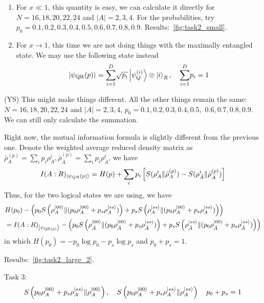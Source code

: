\documentclass{article}
\theoremstyle{plain}
\theoremstyle{definition}
\theoremstyle{plain}
\newcommand{\YS}[1]{{\color{YSblue}\footnotesize{(YS) #1}}}
\begin{document}
\begin{enumerate}
    \item For $x\ll 1$, this quantity is easy, we can calculate it directly for $N=16,18,20,22,24$ and $|A|=2,3,4$. For the probabilities, try $p_0=0.1, 0.2, 0.3, 0.4, 0.5, 0.6, 0.7, 0.8, 0.9$. Results:~\cref{fig:task2_small}.
    \item For $x \rightarrow 1$, this time we are not doing things with the maximally entangled state. We may use the following state instead
    \begin{equation}
        \ket{\psi_{\text{QR}}(p)}=\overunderset{D}{i=1}{\sum}\sqrt{p_i}\ket{\psi_Q^{(i)}}\otimes \ket{i}_R,\quad \overunderset{D}{i=1}{\sum}p_i=1
    \end{equation}
\end{enumerate}
\YS{This might make things different.} All the other things remain the same: $N=16,18,20,22,24$ and $|A|=2,3,4$, $p_0=0.1, 0.2, 0.3, 0.4, 0.5,$ $0.6 ,0.7, 0.8, 0.9$. We can still only calculate the summation.

Right now, the mutual information formula is slightly different from the previous one. Denote the weighted average reduced density matrix as $\bar{\rho}_A^{(p)}=\sum_i p_i \rho_A^i, \bar{\rho}_{\bar{A}}^{(p)}=\sum_i p_i \rho_{\bar{A}}^i$, we have
\begin{equation}
    I(A:R)_{\ket{\psi_{QR}(p)}}=H(p)+\sum_i p_i\left[ S(\rho_A^i\| \bar{\rho}_A^{(p)})-S(\rho_{\bar{A}}^i\| \bar{\rho}_{\bar{A}}^{(p)})\right]
\end{equation}
Thus, for the two logical states we are using, we have
\begin{equation}
    \begin{aligned}
    &H(p_0) -\left(p_0S\left(\rho_{A}^{\ket{00}} \|(p_0\rho_{A}^{\ket{00}}+p_s \rho_{A}^{\ket{ss}})\right)+p_sS\left(\rho_{A}^{\ket{ss}} \|(p_0\rho_{A}^{\ket{00}}+ p_s\rho_{A}^{\ket{ss}})\right)\right)\\
    &=I(A:R)_{\ket{\psi_{\text{QR}(p)}}}-\left(p_0S\left(\rho_{\bar A}^{\ket{00}} \|(p_0\rho_{\bar A}^{\ket{00}}+p_s \rho_{\bar A}^{\ket{ss}})\right)+p_sS\left(\rho_{\bar A}^{\ket{ss}} \|(p_0\rho_{\bar A}^{\ket{00}}+p_s \rho_{\bar A}^{\ket{ss}})\right)\right)
    \end{aligned}
    \end{equation}
in which $H(p_0)=-p_0\log p_0-p_s\log p_s$ and $p_0+p_s=1$.

Results:~\cref{fig:task2_large_2}.

Task 3: 
\begin{equation}
S\left(p_0\rho_{A}^{\ket{00}}+p_s\rho_{A}^{\ket{ss}}\|\rho_{A}^{\ket{00}}\right),\quad S\left(p_0\rho_{A}^{\ket{00}}+p_s\rho_{A}^{\ket{ss}}\|\rho_{A}^{\ket{ss}}\right)\quad p_0+p_s=1
\end{equation}
\end{document}
